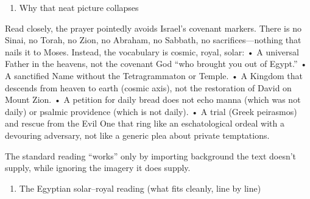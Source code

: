 \begin{enumerate}
\def\labelenumi{\arabic{enumi})}
\setcounter{enumi}{1}
\item
  Why that neat picture collapses
\end{enumerate}

Read closely, the prayer pointedly avoids Israel's covenant markers.
There is no Sinai, no Torah, no Zion, no Abraham, no Sabbath, no sacrifices---nothing that nails it to Moses.
Instead, the vocabulary is cosmic, royal, solar: • A universal Father in the heavens, not the covenant God ``who brought you out of Egypt.'' • A sanctified Name without the Tetragrammaton or Temple.
• A Kingdom that descends from heaven to earth (cosmic axis), not the restoration of David on Mount Zion.
• A petition for daily bread does not echo manna (which was not daily) or psalmic providence (which is not daily).
• A trial (Greek peirasmos) and rescue from the Evil One that ring like an eschatological ordeal with a devouring adversary, not like a generic plea about private temptations.

The standard reading ``works'' only by importing background the text doesn't supply, while ignoring the imagery it does supply.

\begin{enumerate}
\def\labelenumi{\arabic{enumi})}
\setcounter{enumi}{2}
\item
  The Egyptian solar--royal reading (what fits cleanly, line by line)
\end{enumerate}

